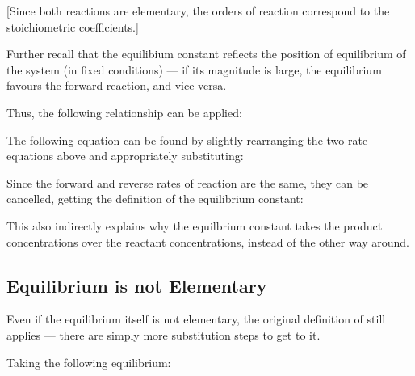 			\eqndiagram{
				\[ R_{fwd} = k_{fwd}[\mathrm{N_{2}O_{4}}]  \qquad\qquad  R_{rev} = k_{rev}[\mathrm{NO_{2}}]^{2} \]
			}[Since both reactions are elementary, the orders of reaction correspond to the stoichiometric coefficients.]

			\pagebreak

			Further recall that the equilibium constant reflects the position of equilibrium of the system (in fixed conditions) --- if its magnitude
			is large, the equilibrium favours the forward reaction, and vice versa.

			Thus, the following relationship can be applied:

			\eqndiagram{
				\[ K_{c} = \frac{k_{fwd}}{k_{rev}} \]
			}

			The following equation can be found by slightly rearranging the two rate equations above and appropriately substituting:

			\eqndiagram{
				\[ K_{c} \quad = \quad \frac{k_{fwd}}{k_{rev}} \quad = \quad \frac{R_{fwd}}{[\mathrm{N_{2}O_{4}}]}
				\; / \; \frac{R_{rev}}{[\mathrm{NO_{2}}]^{2}} \]
			}

			Since the forward and reverse rates of reaction are the same, they can be cancelled, getting the definition of the equilibrium constant:

			\eqndiagram{
				\[ K_{c} = \frac{[\mathrm{NO_{2}}]^{2}}{[\mathrm{N_{2}O_{4}}]} \]
			}

			This also indirectly explains why the equilbrium constant takes the product concentrations over the reactant concentrations, instead of
			the other way around.


		\subsection{Equilibrium is not Elementary}

			Even if the equilibrium itself is not elementary, the original definition of \Kc{} still applies --- there are simply more substitution
			steps to get to it.

			Taking the following equilibrium:






































